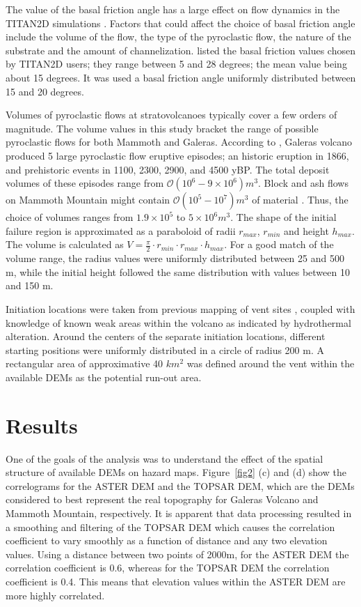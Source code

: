 \documentclass[12pt]{article}
\begin{document}
The value of the basal friction angle has a large effect on flow
dynamics in the TITAN2D simulations \citep{Patra2005,
  stinton_2006}. Factors that could affect the choice of basal
friction angle include the volume of the flow, the type of the
pyroclastic flow, the nature of the substrate and the amount of
channelization. \citet{murcia_2010} listed the basal friction values
chosen by TITAN2D users; they range between 5 and 28 degrees; the mean
value being about 15 degrees. It was used a basal friction angle
uniformly distributed between 15 and 20 degrees.
 
Volumes of pyroclastic flows at stratovolcanoes typically cover a few
orders of magnitude. The volume values in this study bracket the range
of possible pyroclastic flows for both Mammoth and Galeras.  According
to \citet{calvache_1990a}, Galeras volcano produced 5 large
pyroclastic flow eruptive episodes; an historic eruption in 1866, and
prehistoric events in 1100, 2300, 2900, and 4500 yBP.  The total
deposit volumes of these episodes range from $\mathcal{O}(10^6 - 9\times 10^6)
m^3$.  Block and ash flows on Mammoth Mountain might contain $\mathcal{O}(10^5 -
10^7) m^3$ of material \citep{Patra2005, Burkett2007}.  Thus, the
choice of volumes ranges from $1.9 \times 10^5$ to $5 \times 10^6
m^3$.  The shape of the initial failure region is approximated as a
paraboloid of radii $r_{max}$, $r_{min}$ and height $h_{max}$. The volume is calculated as $
V=\frac{\pi}{2}\cdot r_{min}\cdot r_{max} \cdot h_{max}. $ For a good
match of the volume range, the radius values were uniformly
distributed between 25 and 500 m, while the initial height followed
the same distribution with values between 10 and 150 m.

Initiation locations were taken from previous mapping of vent sites \citep{Bailey1989},
coupled with knowledge of known weak areas within the volcano as
indicated by hydrothermal alteration.  Around the centers of the
separate initiation locations, different starting positions were
uniformly distributed in a circle of radius 200 m.  A rectangular area
of approximative 40 $km^2$ was defined around the vent within the
available DEMs as the potential run-out area.

\section{Results}

One of the goals of the analysis was to understand the effect of the
spatial structure of available DEMs on hazard maps. Figure~\ref{fig2}
(c) and (d) show the correlograms for the ASTER DEM and the TOPSAR
DEM, which are the DEMs considered to best represent the real
topography for Galeras Volcano and Mammoth Mountain, respectively. It
is apparent that data processing resulted in a smoothing and filtering
of the TOPSAR DEM which causes the correlation coefficient to vary
smoothly as a function of distance and any two elevation values.
Using a distance between two points of 2000m, for the ASTER DEM the
correlation coefficient is 0.6, whereas for the TOPSAR DEM the
correlation coefficient is 0.4. This means that elevation values
within the ASTER DEM are more highly correlated.
\end{document}
